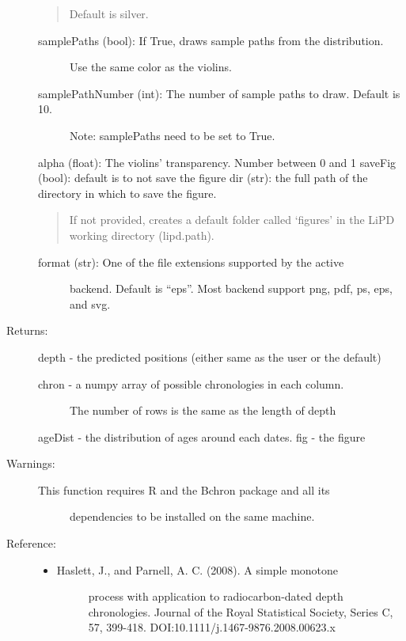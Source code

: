 \documentclass[letterpaper,10pt,english]{sphinxmanual}
\begin{document}
\begin{fulllineitems}
\begin{description}
\begin{quote}
Default is silver.
\end{quote}
\begin{description}
\item[{samplePaths (bool): If True, draws sample paths from the distribution.}] \leavevmode
Use the same color as the violins.

\item[{samplePathNumber (int): The number of sample paths to draw. Default is 10.}] \leavevmode
Note: samplePaths need to be set to True.

\end{description}

alpha (float): The violins’ transparency. Number between 0 and 1
saveFig (bool): default is to not save the figure
dir (str): the full path of the directory in which to save the figure.
\begin{quote}

If not provided, creates a default folder called ‘figures’ in the
LiPD working directory (lipd.path).
\end{quote}
\begin{description}
\item[{format (str): One of the file extensions supported by the active}] \leavevmode
backend. Default is “eps”. Most backend support png, pdf, ps, eps,
and svg.

\end{description}

\item[{Returns:}] \leavevmode
depth - the predicted positions (either same as the user or the default)
\begin{description}
\item[{chron -  a numpy array of possible chronologies in each column.}] \leavevmode
The number of rows is the same as the length of depth

\end{description}

ageDist - the distribution of ages around each dates.
fig - the figure

\item[{Warnings:}] \leavevmode\begin{description}
\item[{This function requires R and the Bchron package and all its}] \leavevmode
dependencies to be installed on the same machine.

\end{description}

\item[{Reference:}] \leavevmode\begin{itemize}
\item {} \begin{description}
\item[{Haslett, J., and Parnell, A. C. (2008). A simple monotone }] \leavevmode
process with application to radiocarbon-dated depth 
chronologies. Journal of the Royal Statistical Society, 
Series C, 57, 399-418. DOI:10.1111/j.1467-9876.2008.00623.x


\end{description}
\end{itemize}
\end{description}
\end{fulllineitems}
\end{document}
